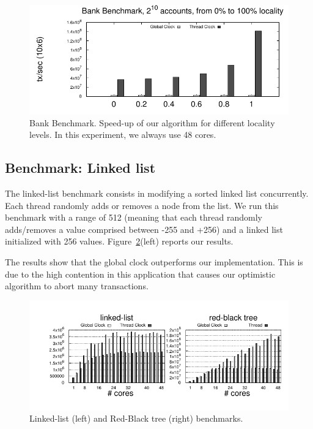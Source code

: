 \begin{figure}[!t]
	\centering
	\includegraphics[scale = 0.8]{results/bank-speedup/bank-speedup.pdf}
	\caption{Bank Benchmark. Speed-up of our algorithm for different locality levels. In this experiment, we always use 48 cores.\label{fig:benchmarking:bank:speedup}}
\end{figure}


\subsection{Benchmark: Linked list}

The linked-list benchmark consists in modifying a sorted linked list concurrently. 
Each thread randomly adds or removes a node from the list. 
We run this benchmark with a range of 512 (meaning that each thread randomly adds/removes a value comprised between -255 and +256) and a linked list initialized with 256 values.
Figure~\ref{fig:benchmarking:llrb}(left) reports our results.

The results show that the global clock outperforms our implementation. 
This is due to the high contention in this application that causes our optimistic algorithm to abort  many transactions.

\begin{figure}[!t]
	\centering
	\includegraphics[scale = 1.0]{results/intset/ll-rb.pdf}
	\caption{Linked-list (left) and Red-Black tree (right) benchmarks.\label{fig:benchmarking:llrb}}
\end{figure}

